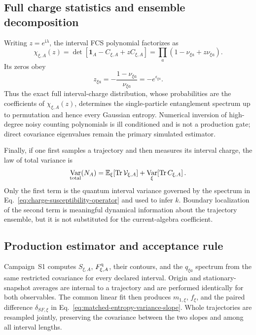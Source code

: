 \documentclass[aps,prx,twocolumn,floatfix,nofootinbib,superscriptaddress,longbibliography]{revtex4-2}
\DeclareMathOperator{\Var}{Var}
\newcommand{\ii}{\boldsymbol{\mathrm{i}}}
\newcommand{\E}{\mathbb{E}}
\newcommand{\qTr}{\operatorname{Tr}}
\begin{document}
\subsection{Full charge statistics and ensemble decomposition}

Writing $z=e^{\ii\lambda}$, the interval FCS polynomial factorizes as
\begin{equation}
 \chi_{\xi,A}(z)
 =\det[\mathbf{1}_A-C_{\xi,A}+zC_{\xi,A}]
 =\prod_a(1-\nu_{\xi a}+z\nu_{\xi a}).
 \label{eq:fcs-polynomial-factorization}
\end{equation}
Its zeros obey
\begin{equation}
 z_{\xi a}=-\frac{1-\nu_{\xi a}}{\nu_{\xi a}}
 =-e^{\epsilon_{\xi a}}.
 \label{eq:fcs-zero-entanglement-spectrum}
\end{equation}
Thus the exact full interval-charge distribution, whose probabilities are the coefficients
of $\chi_{\xi,A}(z)$, determines the single-particle entanglement spectrum up to
permutation and hence every Gaussian entropy.  Numerical inversion of high-degree noisy
counting polynomials is ill conditioned and is not a production gate; direct covariance
eigenvalues remain the primary simulated estimator.

Finally, if one first samples a trajectory and then measures its interval charge, the law
of total variance is
\begin{equation}
 \Var_{\rm total}(N_A)
 =\E_\xi\!\left[\qTr\mathcal V_{\xi,A}\right]
 +\Var_\xi\!\left[\qTr C_{\xi,A}\right].
 \label{eq:appendix-total-variance-spectrum}
\end{equation}
Only the first term is the quantum interval variance governed by the spectrum in
Eq.~\eqref{eq:charge-susceptibility-operator} and used to infer $k$.  Boundary localization
of the second term is meaningful dynamical information about the trajectory ensemble, but
it is not substituted for the current-algebra coefficient.

\subsection{Production estimator and acceptance rule}

Campaign~S1 computes $S_{\xi,A}$, $F_{\xi,A}^{\rm q}$, their contours, and the
$q_{\xi a}$ spectrum from the same restricted covariance for every declared interval.
Origin and stationary-snapshot averages are internal to a trajectory and are performed
identically for both observables.  The common linear fit then produces
$m_{1,\xi}$, $f_\xi$, and the paired difference $\delta_{SF,\xi}$ in
Eq.~\eqref{eq:matched-entropy-variance-slope}.  Whole trajectories are resampled jointly,
preserving the covariance between the two slopes and among all interval lengths.
\end{document}
